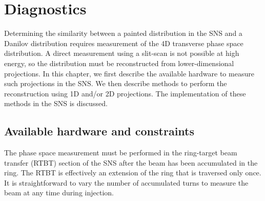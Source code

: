 \chapter{Diagnostics} \label{chap-4}

Determining the similarity between a painted distribution in the SNS and a Danilov distribution requires measurement of the 4D transverse phase space distribution. A direct measurement using a slit-scan \cite{Cathey2018} is not possible at high energy, so the distribution must be reconstructed from lower-dimensional projections. In this chapter, we first describe the available hardware to measure such projections in the SNS. We then describe methods to perform the reconstruction using 1D and/or 2D projections. The implementation of these methods in the SNS is discussed.


\section{Available hardware and constraints}

The phase space measurement must be performed in the ring-target beam transfer (RTBT) section of the SNS after the beam has been accumulated in the ring. The RTBT is effectively an extension of the ring that is traversed only once. It is straightforward to vary the number of accumulated turns to measure the beam at any time during injection. 

